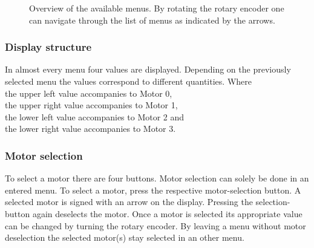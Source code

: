 \begin{figure}[H]
\caption[Overview of the available menus.]{Overview of the available menus. By rotating the rotary encoder one can navigate through the list of menus as indicated by the arrows.}
\label{main_menu}
\end{figure}

\subsubsection{Display structure}
In almost every menu four values are displayed. Depending on the previously selected menu the values correspond to different quantities. Where\\
the upper left value accompanies to Motor 0,\\
the upper right value accompanies to Motor 1,\\
the lower left value accompanies to Motor 2 and\\
the lower right value accompanies to Motor 3.

\subsubsection{Motor selection}
To select a motor there are four buttons. Motor selection can solely be done in an entered menu. To select a motor, press the respective motor-selection button. A selected motor is signed with an arrow on the display. Pressing the selection-button again deselects the motor. Once a motor is selected its appropriate value can be changed by turning the rotary encoder. By leaving a menu without motor deselection the selected motor(s) stay selected in an other menu.

